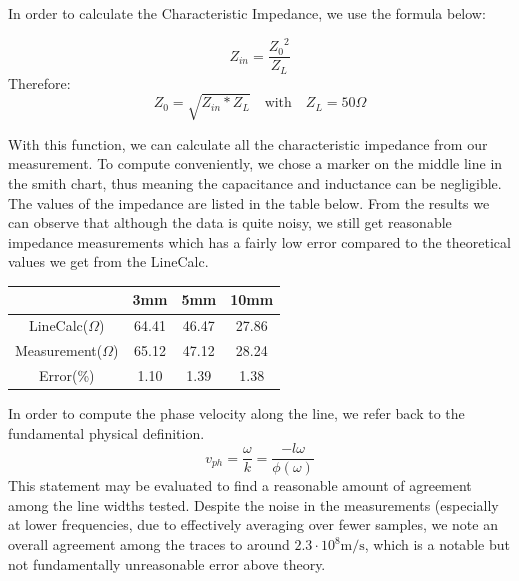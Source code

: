\documentclass{article}
\begin{document}
\begin{flushleft}
In order to calculate the Characteristic Impedance, we use the formula below:
\end{flushleft}

\[Z_{in} =  \frac{{Z_0}^2}{Z_L}\]
Therefore:
\begin{equation}
    Z_0 = \sqrt{Z_{in}*Z_L} \quad \text{with} \quad Z_L = 50 \Omega
\end{equation}

\begin{flushleft}
With this function, we can calculate all the characteristic impedance from our measurement. To compute conveniently, we chose a marker on the middle line in the smith chart, thus meaning the capacitance and inductance can be negligible. The values of the impedance are listed in the table below. From the results we can observe that although the data is quite noisy, we still get reasonable impedance measurements which has a fairly low error compared to the theoretical values we get from the LineCalc. 
\end{flushleft}

\begin{center}
\begin{tabular}{||c c c c||} 
 \hline
 \quad & 3mm & 5mm & 10mm \\ [0.7ex] 
 \hline\hline
 LineCalc($\Omega$) & 64.41 & 46.47 & 27.86 \\ [0.7ex] 
 \hline
 Measurement($\Omega$) & 65.12 & 47.12 & 28.24 \\[0.7ex] 
 \hline
 Error(\%) & 1.10 & 1.39 & 1.38 \\[0.7ex] 
 \hline

\end{tabular}
\end{center}







In order to compute the phase velocity along the line, we refer back to the fundamental physical definition.
\begin{equation}
    v_{ph} = \frac{\omega}{k} = \frac{-l \omega}{\phi(\omega)}
\end{equation}
This statement may be evaluated to find a reasonable amount of agreement among the line widths tested.
Despite the noise in the measurements (especially at lower frequencies, due to effectively averaging over fewer samples,
we note an overall agreement among the traces to around $2.3 \cdot 10^8 \si{\meter\per\second}$, which is a notable but not fundamentally unreasonable error above theory.
\end{document}
